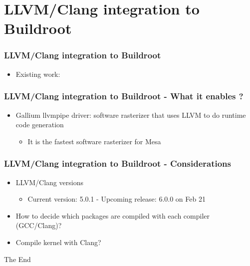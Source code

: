 \documentclass{beamer}
\begin{document}
\section{LLVM/Clang integration to Buildroot}

\begin{frame}
\frametitle{LLVM/Clang integration to Buildroot}
\begin{itemize}
  \item Existing work:
\end{itemize}
\end{frame}

\begin{frame}
\frametitle{LLVM/Clang integration to Buildroot - What it enables ?}
\begin{itemize}
  \item Gallium llvmpipe driver: software rasterizer that uses LLVM to do runtime code generation
  \begin{itemize}
    \item It is the fastest software rasterizer for Mesa
  \end{itemize}
\end{itemize}
\end{frame}

\begin{frame}
\frametitle{LLVM/Clang integration to Buildroot - Considerations}
\begin{itemize}
  \item LLVM/Clang versions
  \begin{itemize}
    \item Current version: 5.0.1 - Upcoming release: 6.0.0 on Feb 21
  \end{itemize}
  \item How to decide which packages are compiled with each compiler (GCC/Clang)?
  \item Compile kernel with Clang?
\end{itemize}
\end{frame}
\begin{frame}
\Huge{\centerline{The End}}
\end{frame}
\end{document}
